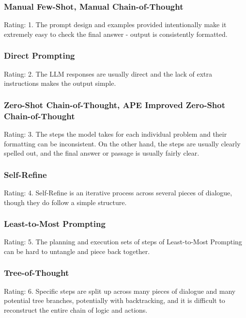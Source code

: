 \documentclass[11pt]{article}
\begin{document}
\subsubsection*{Manual Few-Shot, Manual Chain-of-Thought}

Rating: 1. The prompt design and examples provided intentionally make it extremely easy to check the final answer - output is consistently formatted.

\subsubsection*{Direct Prompting}

Rating: 2. The LLM responses are usually direct and the lack of extra instructions makes the output simple. 

\subsubsection*{Zero-Shot Chain-of-Thought, APE Improved Zero-Shot Chain-of-Thought}

Rating: 3. The steps the model takes for each individual problem and their formatting can be inconsistent. On the other hand, the steps are usually clearly spelled out, and the final answer or passage is usually fairly clear.

\subsubsection*{Self-Refine}

Rating: 4. Self-Refine is an iterative process across several pieces of dialogue, though they do follow a simple structure.

\subsubsection*{Least-to-Most Prompting}

Rating: 5. The planning and execution sets of steps of Least-to-Most Prompting can be hard to untangle and piece back together.

\subsubsection*{Tree-of-Thought}

Rating: 6. Specific steps are split up across many pieces of dialogue and many potential tree branches, potentially with backtracking, and it is difficult to reconstruct the entire chain of logic and actions.
\end{document}
